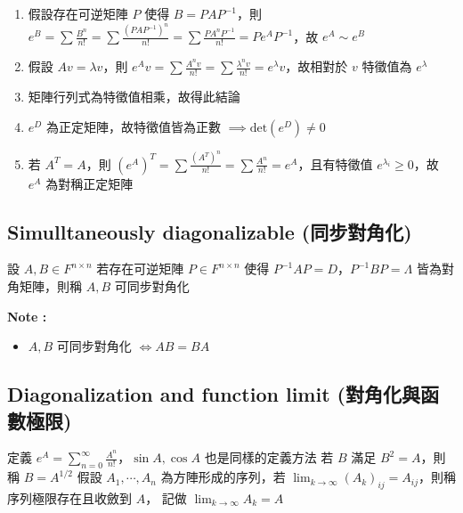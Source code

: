 \documentclass[
]{book}
\providecommand{\tightlist}{%
  \setlength{\itemsep}{0pt}\setlength{\parskip}{0pt}}
\begin{document}
\begin{enumerate}
\def\labelenumi{\arabic{enumi}.}
\tightlist
\item
  假設存在可逆矩陣 \(P\) 使得 \(B = PAP^{-1}\)，則 \(e^B = \sum\frac{B^n}{n!} = \sum\frac{(PAP^{-1})^n}{n!} = \sum\frac{PA^nP^{-1}}{n!} = Pe^AP^{-1}\)，故 \(e^A \sim e^B\)
\item
  假設 \(Av = \lambda v\)，則 \(e^Av = \sum\frac{A^nv}{n!} = \sum \frac{\lambda^nv}{n!} = e^{\lambda}v\)，故相對於 \(v\) 特徵值為 \(e^{\lambda}\)
\item
  矩陣行列式為特徵值相乘，故得此結論
\item
  \(e^D\) 為正定矩陣，故特徵值皆為正數 \(\implies \mbox{det}(e^D) \neq 0\)
\item
  若 \(A^T = A\)，則 \((e^A)^T = \sum \frac{(A^T)^n}{n!} = \sum \frac{A^n}{n!} = e^A\)，且有特徵值 \(e^{\lambda_i} \geq 0\)，故 \(e^A\) 為對稱正定矩陣
\end{enumerate}

\hypertarget{simulltaneously-diagonalizable-ux540cux6b65ux5c0dux89d2ux5316-1}{%
\subsection{Simulltaneously diagonalizable (同步對角化)}\label{simulltaneously-diagonalizable-ux540cux6b65ux5c0dux89d2ux5316-1}}

設 \(A, B \in F^{n\times n}\) 若存在可逆矩陣 \(P \in F^{n\times n}\) 使得 \(P^{-1}AP = D\)，\(P^{-1}BP = \Lambda\) 皆為對角矩陣，則稱 \(A, B\) 可同步對角化

\textbf{Note :}

\begin{itemize}
\tightlist
\item
  \(A, B\) 可同步對角化 \(\iff AB = BA\)
\end{itemize}

\hypertarget{diagonalization-and-function-limit-ux5c0dux89d2ux5316ux8207ux51fdux6578ux6975ux9650-1}{%
\subsection{Diagonalization and function limit (對角化與函數極限)}\label{diagonalization-and-function-limit-ux5c0dux89d2ux5316ux8207ux51fdux6578ux6975ux9650-1}}

定義 \(e^A = \displaystyle \sum_{n=0}^{\infty}\frac{A^n}{n!}\)，\(\sin A, \cos A\) 也是同樣的定義方法
若 \(B\) 滿足 \(B^2 = A\)，則稱 \(B = A^{1/2}\)
假設 \(A_1, \cdots, A_n\) 為方陣形成的序列，若 \(\displaystyle\lim_{k \to \infty}(A_k)_{ij} = A_{ij}\)，則稱序列極限存在且收斂到 \(A\)，
記做 \(\displaystyle \lim_{k \to \infty}A_k = A\)
\end{document}
